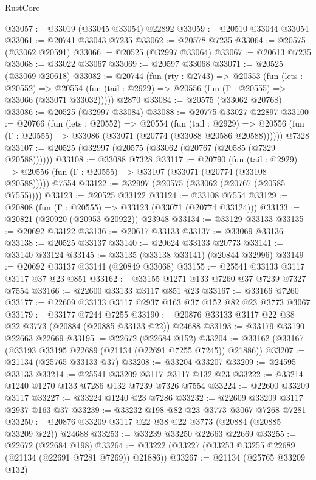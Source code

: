 \begin{lexlean}{RustCore}
\begin{coremodule}
@33057 := @33019 (@33045 @33054) @22892
@33059 := @20510 @33044 @33054
@33061 := @20741 @33043 @7235
@33062 := @20578 @7235
@33064 := @20575 (@33062 @20591)
@33066 := @20525 (@32997 @33064)
@33067 := @20613 @7235
@33068 := @33022 @33067
@33069 := @20597 @33068
@33071 := @20525 (@33069 @20618)
@33082 := @20744
    (fun (rty : @2743) =>
    @20553
      (fun (lets : @20552) =>
      @20554 (fun (tail : @2929) => @20556 (fun (Γ : @20555) => @33066 (@33071 @33032)))))
    @2870
@33084 := @20575 (@33062 @20768)
@33086 := @20525 (@32997 @33084)
@33088 := @20775 @33027 @22897
@33100 := @20766
    (fun (lets : @20552) =>
    @20554
      (fun (tail : @2929) =>
      @20556 (fun (Γ : @20555) => @33086 (@33071 (@20774 (@33088 @20586 @20588))))))
    @7328
@33107 := @20525 (@32997 (@20575 (@33062 (@20767 (@20585 (@7329 @20588))))))
@33108 := @33088 @7328
@33117 := @20790
    (fun (tail : @2929) => @20556 (fun (Γ : @20555) => @33107 (@33071 (@20774 (@33108 @20588)))))
    @7554
@33122 := @32997 (@20575 (@33062 (@20767 (@20585 @7555))))
@33123 := @20525 @33122
@33124 := @33108 @7554
@33129 := @20808 (fun (Γ : @20555) => @33123 (@33071 (@20774 @33124)))
@33133 := @20821 (@20920 (@20953 @20922)) @23948
@33134 := @33129 @33133
@33135 := @20692 @33122
@33136 := @20617 @33133
@33137 := @33069 @33136
@33138 := @20525 @33137
@33140 := @20624 @33133 @20773
@33141 := @33140 @33124
@33145 := @33135 (@33138 @33141) (@20844 @32996)
@33149 := @20692 @33137 @33141 (@20849 @33068)
@33155 := @25541 @33133 @3117 @3117 @37 @23 @851
@33162 := @33155 @1271 @133 @7260 @37 @7239 @7327 @7554
@33166 := @22600 @33133 @3117 @851 @23
@33167 := @33166 @7260
@33177 := @22609 @33133 @3117 @2937 @163 @37 @152 @82 @23 @3773 @3067
@33179 := @33177 @7244 @7255
@33190 := @20876 @33133 @3117 @22 @38 @22 @3773 (@20884 (@20885 @33133 @22)) @24688
@33193 := @33179 @33190 @22663 @22669
@33195 := @22672 (@22684 @152)
@33204 := @33162 (@33167 (@33193 @33195 @22689 (@21134 (@22691 @7255 @7245)) @21886))
@33207 := @21134 (@25765 @33133 @37)
@33208 := @33204 @33207
@33209 := @24595 @33133
@33214 := @25541 @33209 @3117 @3117 @132 @23
@33222 := @33214 @1240 @1270 @133 @7286 @132 @7239 @7326 @7554
@33224 := @22600 @33209 @3117
@33227 := @33224 @1240 @23 @7286
@33232 := @22609 @33209 @3117 @2937 @163 @37
@33239 := @33232 @198 @82 @23 @3773 @3067 @7268 @7281
@33250 := @20876 @33209 @3117 @22 @38 @22 @3773 (@20884 (@20885 @33209 @22)) @24688
@33253 := @33239 @33250 @22663 @22669
@33255 := @22672 (@22684 @198)
@33264 := @33222 (@33227 (@33253 @33255 @22689 (@21134 (@22691 @7281 @7269)) @21886))
@33267 := @21134 (@25765 @33209 @132)

\end{coremodule}
\end{lexlean}
